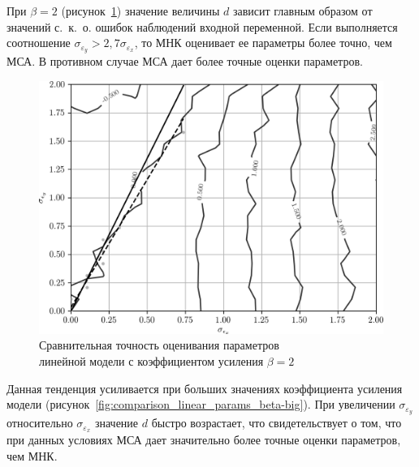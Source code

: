 \pagebreak
При \( \beta = 2 \) (рисунок~\ref{fig:comparison_linear_params_beta-2})
значение величины \( d \) зависит главным образом от значений с.~к.~о. ошибок
наблюдений входной переменной.
Если выполняется соотношение \( \sigma_{\varepsilon_y} > 2{,}7 \sigma_{\varepsilon_x} \),
то МНК оценивает ее параметры более точно, чем МСА.
В противном случае МСА дает более точные оценки параметров.

\begin{figure}[h]
  \centering
  \includegraphics[width=135mm]{fig/linear/param/beta-2_param-accs-approx.png}
  \caption{%
    Сравнительная точность оценивания параметров \\
    линейной модели с коэффициентом усиления \( \beta = 2 \)
  }\label{fig:comparison_linear_params_beta-2}
\end{figure}

Данная тенденция усиливается при больших значениях коэффициента усиления модели
(рисунок~\ref{fig:comparison_linear_params_beta-big}).
При увеличении \( \sigma_{\varepsilon_y} \) относительно \( \sigma_{\varepsilon_x} \) значение
\( d \) быстро возрастает, что свидетельствует о том,
что при данных условиях МСА дает значительно более точные оценки параметров, чем МНК.

